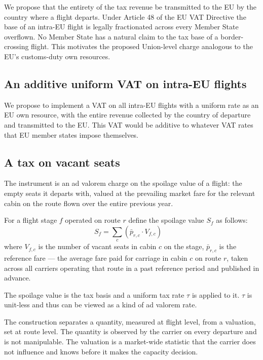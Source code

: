 \documentclass[../../main]{subfiles}
\begin{document}
We propose that the entirety of the tax revenue be transmitted to the EU by the country where a flight departs. Under Article 48 of the EU VAT Directive the base of an intra-EU flight is legally fractionated across every Member State overflown. No Member State has a natural claim to the tax base of a border-crossing flight. This motivates the proposed Union-level charge analogous to the EU's customs-duty own resources. 

\subsection{An additive uniform VAT on intra-EU flights}
We propose to implement a VAT on all intra-EU flights with a uniform rate as an EU own resource, with the entire revenue collected by the country of departure and transmitted to the EU. This VAT would be additive to whatever VAT rates that EU member states impose themselves. 

\subsection{A tax on vacant seats}
The instrument is an ad valorem charge on the spoilage value of a flight: the empty seats it departs with, valued at the prevailing market fare for the relevant cabin on the route flown over the entire previous year.

For a flight stage $f$ operated on route $r$ define the spoilage value $S_f$ as follows:
\[
S_f = \sum_c \left( \bar{p}_{r,c} \cdot V_{f,c} \right) \quad 
\]
where $V_{f,c}$ is the number of vacant seats in cabin $c$ on the stage, $\bar{p}_{r,c}$ is the reference fare --- the average fare paid for carriage in cabin $c$ on route $r$, taken across all carriers operating that route in a past reference period and published in advance.

The spoilage value is the tax basis and a uniform tax rate $\tau$ is applied to it. $\tau$ is unit-less and thus can be viewed as a kind of ad valorem rate.

The construction separates a quantity, measured at flight level, from a valuation, set at route level. The quantity is observed by the carrier on every departure and is not manipulable. The valuation is a market-wide statistic that the carrier does not influence and knows before it makes the capacity decision. 

\end{document}
